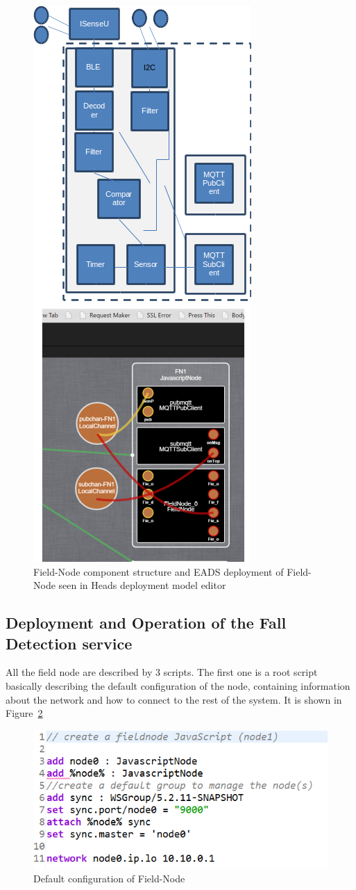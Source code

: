 \begin{figure}[h]
	\centering
	\includegraphics[width=0.5\linewidth]{figures/fig5}
	\caption{Field-Node component structure and EADS deployment of Field-Node seen in Heads deployment model editor}
	\label{fig:fig5}
\end{figure}


\subsection{Deployment and Operation of the Fall Detection service}
All the field node are described by 3 scripts. The first one is a root script basically describing the default configuration of the node, containing information about the network and how to connect to the rest of the system. It is shown in Figure~\ref{fig:fig6}

\begin{figure}[h]
	\centering
	\includegraphics[width=1\linewidth]{figures/fig6}
	\caption{Default configuration of Field-Node}
	\label{fig:fig6}
\end{figure}

